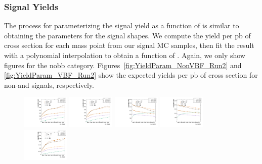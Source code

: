 \subsubsection{Signal Yields}

The process for parameterizing the signal yield as a function of \MX is similar to obtaining the parameters for the signal shapes.
We compute the yield per pb of cross section for each mass point from our signal MC samples, then fit the result with a polynomial interpolation to obtain a function of \MX.
Again, we only show figures for the nobb category.
Figures~\ref{fig:YieldParam_NonVBF_Run2} and \ref{fig:YieldParam_VBF_Run2} show the expected yields per pb of cross section for non-\VBF and \VBF signals, respectively.

\begin{figure}[htbp]
  \centering
  \includegraphics[width=0.2\textwidth]{fig/2Dfit/paramSignalYield_NonVBFSig_mu_HP_nobb_LDy.pdf}
  \includegraphics[width=0.2\textwidth]{fig/2Dfit/paramSignalYield_NonVBFSig_e_HP_nobb_LDy.pdf}
  \includegraphics[width=0.2\textwidth]{fig/2Dfit/paramSignalYield_NonVBFSig_mu_LP_nobb_LDy.pdf}
  \includegraphics[width=0.2\textwidth]{fig/2Dfit/paramSignalYield_NonVBFSig_e_LP_nobb_LDy.pdf}\\
  \includegraphics[width=0.2\textwidth]{fig/2Dfit/paramSignalYield_NonVBFSig_mu_HP_nobb_HDy.pdf}

\end{figure}
